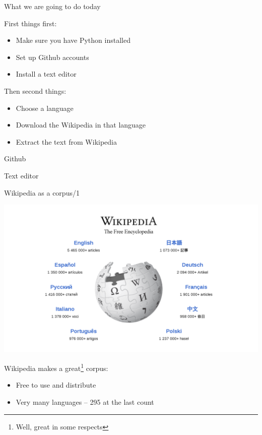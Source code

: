 \documentclass[10pt, compress]{beamer}
\begin{document}
\begin{frame}{What we are going to do today}

First things first:
\begin{itemize}
  \item Make sure you have Python installed
  \item Set up Github accounts
  \item Install a text editor
\end{itemize}

Then second things:
\begin{itemize}
  \item Choose a language
  \item Download the Wikipedia in that language 
  \item Extract the text from Wikipedia
\end{itemize}

\end{frame}

\begin{frame}{Github}

\end{frame}

\begin{frame}{Text editor}



\end{frame}

\begin{frame}{Wikipedia as a corpus/1}

\begin{center}
\includegraphics[width=\textwidth]{graphics/wikipedia-front.png}
\end{center}

Wikipedia makes a great\footnote{Well, great in some respects} corpus:

\begin{itemize}
   \item Free to use and distribute
   \item Very many languages -- 295 at the last count
\end{itemize}

\end{frame}
\end{document}
